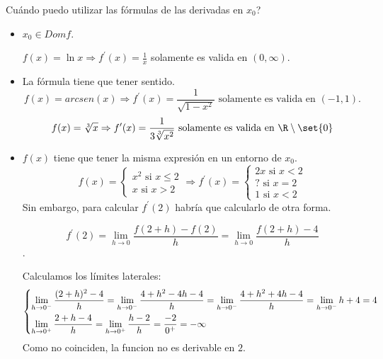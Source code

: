 Cuándo puedo utilizar las fórmulas de las derivadas en \(x_0\)?
\begin{itemize}
	\item \(x_0 \in Domf \).

	      \(f(x) = \ln x \Rightarrow f^\prime (x) = \frac{1}{x}\) solamente es valida en \((0,\infty )\).

	\item La fórmula tiene que tener sentido.
	      \[
		      f(x) = arcsen(x) \Rightarrow f^\prime (x) = \frac{1}{\sqrt{1 - x^{2} } } \text{ solamente es valida en } (-1,1).
	      \]
	      \[
		      f(x) = \sqrt[3]{x} \Rightarrow f^\prime (x) = \frac{1}{3 \sqrt[3]{x^{2} } } \text{ solamente es valida en } \R \setminus \set{0}
	      \]
	\item \(f(x )\) tiene que tener la misma expresión en un entorno de \(x_0 \).
	      \[
		      f(x) = \begin{cases}
			      x^{2} \text{ si } x \leq 2 \\
			      x \text{ si } x > 2
		      \end{cases} \Rightarrow f^\prime (x) = \begin{cases}
			      2x \text{ si } x < 2 \\
			      ? \text{ si } x = 2  \\
			      1 \text{ si } x < 2
		      \end{cases}
	      \]
	      Sin embargo, para calcular \(f^\prime (2 )\) habría que calcularlo de otra forma.

	      \[
		      f^\prime (2) = \lim\limits_{h  \to 0 } \frac{f(2 + h) - f(2)}{h } = \lim\limits_{h  \to 0 } \frac{f(2 + h) - 4 }{h }
	      \].

	      Calculamos los límites laterales:
	      \[
		      \begin{dcases}
			      \lim\limits_{h  \to 0^{-}  } \frac{(2 + h)^{2} - 4 }{h} = \lim\limits_{h  \to 0^{- } } \frac{4 + h^{2} - 4h - 4 }{h} = \lim\limits_{h  \to 0^{-}  } \frac{4 + h^{2} + 4h - 4}{h} = \lim\limits_{h  \to 0^{-} } h + 4 = 4 \\
			      \lim\limits_{h  \to 0^{+}  } \frac{2 + h - 4}{h } = \lim\limits_{h  \to 0^{+} } \frac{h - 2}{h } = \frac{-2}{0^{+} } = -\infty
		      \end{dcases}
	      \]
	      Como no coinciden, la funcion no es derivable en \(2\).
\end{itemize}
